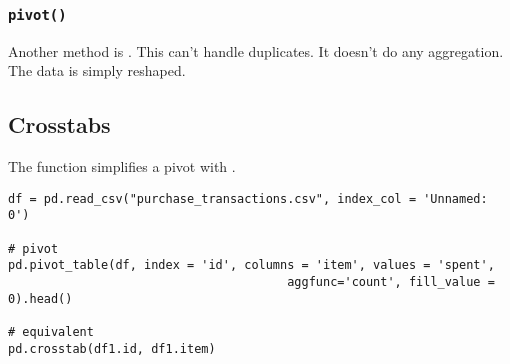 \subsubsection{\texttt{pivot()}}


Another method is . This can't handle duplicates. It doesn't do any aggregation. The data is simply reshaped.

\subsection{Crosstabs}

The  function simplifies a pivot with .


\begin{lstlisting}
df = pd.read_csv("purchase_transactions.csv", index_col = 'Unnamed: 0')

# pivot 
pd.pivot_table(df, index = 'id', columns = 'item', values = 'spent', 
                                       aggfunc='count', fill_value = 0).head()

# equivalent
pd.crosstab(df1.id, df1.item)
\end{lstlisting}

